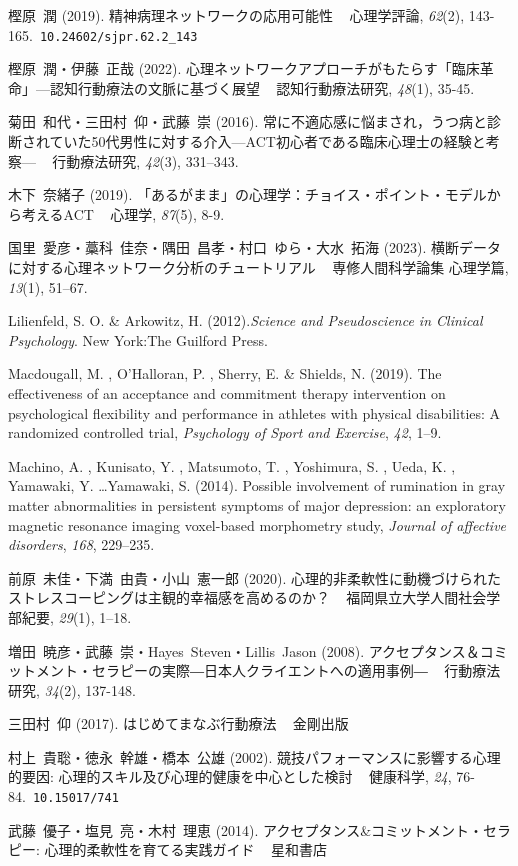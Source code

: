 \documentclass[12pt,a4paper,xelatex,ja=standard]{bxjsarticle}
\begin{document}
樫原~潤 (2019). 精神病理ネットワークの応用可能性 ~ 心理学評論,
\emph{62}(2), 143-165.~\verb|10.24602/sjpr.62.2_143|

樫原~潤・伊藤~正哉 (2022).
心理ネットワークアプローチがもたらす「臨床革命」---認知行動療法の文脈に基づく展望
~ 認知行動療法研究, \emph{48}(1), 35-45.

菊田~和代・三田村~仰・武藤~崇 (2016).
常に不適応感に悩まされ，うつ病と診断されていた50代男性に対する介入---ACT初心者である臨床心理士の経験と考察---
~ 行動療法研究, \emph{42}(3), 331--343.

木下~奈緒子 (2019).
「あるがまま」の心理学：チョイス・ポイント・モデルから考えるACT ~
心理学, \emph{87}(5), 8-9.

国里~愛彦・藁科~佳奈・隅田~昌孝・村口~ゆら・大水~拓海 (2023).
横断データに対する心理ネットワーク分析のチュートリアル ~
専修人間科学論集 心理学篇, \emph{13}(1), 51--67.

Lilienfeld, S. O. \& Arkowitz, H.
(2012).\emph{Science and Pseudoscience in Clinical Psychology}. New
York:The Guilford Press.

Macdougall, M. , O'Halloran, P. , Sherry, E. \& Shields, N. (2019). The
effectiveness of an acceptance and commitment therapy intervention on
psychological flexibility and performance in athletes with physical
disabilities: A randomized controlled trial,
\emph{Psychology of Sport and Exercise}, \emph{42}, 1--9.

Machino, A. , Kunisato, Y. , Matsumoto, T. , Yoshimura, S. , Ueda, K. ,
Yamawaki, Y. \ldots Yamawaki, S. (2014). Possible involvement of
rumination in gray matter abnormalities in persistent symptoms of major
depression: an exploratory magnetic resonance imaging voxel-based
morphometry study, \emph{Journal of affective disorders}, \emph{168},
229--235.

前原~未佳・下満~由貴・小山~憲一郎 (2020).
心理的非柔軟性に動機づけられたストレスコーピングは主観的幸福感を高めるのか？
~ 福岡県立大学人間社会学部紀要, \emph{29}(1), 1--18.

増田~暁彦・武藤~崇・Hayes~Steven・Lillis~Jason (2008).
アクセプタンス＆コミットメント・セラピーの実際―日本人クライエントへの適用事例―
~ 行動療法研究, \emph{34}(2), 137-148.

三田村~仰 (2017). はじめてまなぶ行動療法 ~ 金剛出版

村上~貴聡・徳永~幹雄・橋本~公雄 (2002).
競技パフォーマンスに影響する心理的要因:
心理的スキル及び心理的健康を中心とした検討 ~ 健康科学, \emph{24},
76-84.~\verb|10.15017/741|

武藤~優子・塩見~亮・木村~理恵 (2014).
アクセプタンス\&コミットメント・セラピー: 心理的柔軟性を育てる実践ガイド
~ 星和書店
\end{document}

